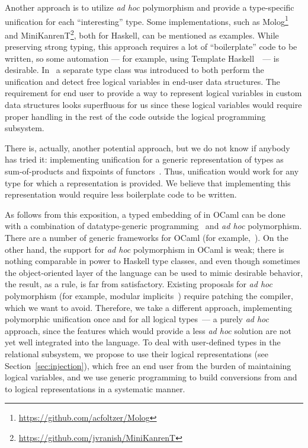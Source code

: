 Another approach is to utilize \emph{ad hoc} polymorphism and provide a type-specific unification for each ``interesting'' type.
Some \miniKanren implementations, such as Molog\footnote{\url{https://github.com/acfoltzer/Molog}} and
MiniKanrenT\footnote{\url{https://github.com/jvranish/MiniKanrenT}}, both for Haskell, can be mentioned as examples.
While preserving strong typing, this approach requires a lot of ``boilerplate''
code to be written, so some automation --- for example, using
Template Haskell~\cite{SheardTMH}~---
is desirable. In~\cite{TypedLogicalVariables} a separate type class was introduced to both perform the unification
and detect free logical variables in end-user data structures. The requirement for end user to provide a way to represent
logical variables in custom data structures looks superfluous for us since these logical variables would require proper
handling in the rest of the code outside the logical programming subsystem.

There is, actually, another potential approach, but we do not know if anybody has tried
it: implementing unification for a generic representation of types as sum-of-products and fixpoints of
functors~\cite{InstantGenerics, ALaCarte}. Thus, unification would work for any type for which a representation
is provided. We believe that implementing this representation would require less boilerplate code to be written.

As follows from this exposition, a typed embedding of \miniKanren in OCaml can be done with
a combination of datatype-generic programming~\cite{DGP} and \emph{ad hoc} polymorphism. There are
a number of generic frameworks for OCaml (for example,~\cite{Deriving}). On the other hand, the support
for \emph{ad hoc} polymorphism in OCaml is weak; there is nothing comparable in power to Haskell
type classes, and even though sometimes the object-oriented layer of the language can be used to mimic
desirable behavior, the result, as a rule, is far from satisfactory. Existing proposals for \emph{ad hoc} polymorphism (for example,
modular implicits~\cite{Implicits}) require patching the compiler, which we want to avoid. Therefore, we
take a different approach, implementing polymorphic unification once and for all logical types~--- a purely \emph{ad hoc}
approach, since the features which would provide a less \emph{ad hoc} solution are not yet well integrated into the language. To deal
with user-defined types in the relational subsystem, we propose to use their logical representations (see Section~\ref{sec:injection}),
which free an end user from the burden of maintaining logical variables, and we use generic programming to build conversions from and to logical
representations in a systematic manner.



